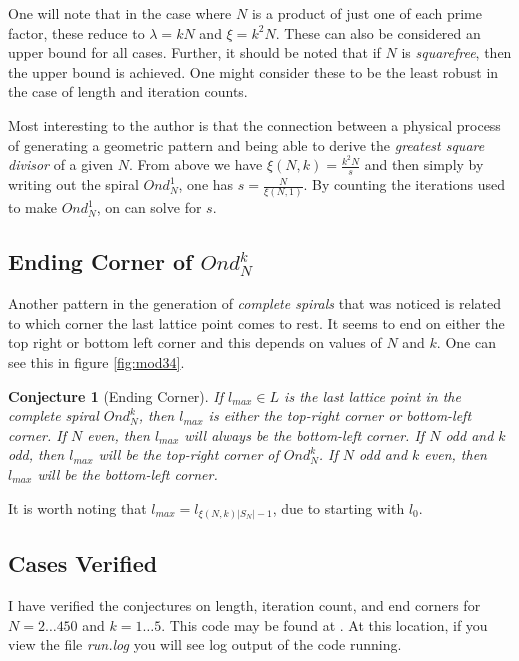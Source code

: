 \documentclass[11pt]{amsart}
\theoremstyle{mydef}
\newtheorem{conj}{Conjecture}[section]
\begin{document}
One will note that in the case where $N$ is a product of just one of each prime factor, these reduce to $\lambda = kN$ and $\xi = k^2N$. These can also be considered an upper bound for all cases. Further, it should be noted that if $N$ is \textit{squarefree}, then the upper bound is achieved. One might consider these to be the least robust in the case of length and iteration counts.

Most interesting to the author is that the connection between a physical process of generating a geometric pattern and being able to derive the \textit{greatest square divisor} of a given $N$. From above we have $\xi(N, k) = \frac{k^2 N}{s}$ and then simply by writing out the spiral $Ond^1_N$, one has $s = \frac{N}{\xi(N,1)}$. By counting the iterations used to make $Ond^1_N$, on can solve for $s$.

\subsection{Ending Corner of $Ond^k_N$}

Another pattern in the generation of \textit{complete spirals} that was noticed is related to which corner the last lattice point comes to rest. It seems to end on either the top right or bottom left corner and this depends on values of $N$ and $k$. One can see this in figure \ref{fig:mod34}. 

\begin{conj}[Ending Corner]
If $l_{max} \in L$ is the last lattice point in the complete spiral $Ond^k_N$, then $l_{max}$ is either the top-right corner or bottom-left corner. If $N$ even, then $l_{max}$ will always be the bottom-left corner. If $N$ odd and $k$ odd, then $l_{max}$ will be the top-right corner of $Ond^k_N$. If $N$ odd and $k$ even, then $l_{max}$ will be the bottom-left corner.
\end{conj}

It is worth noting that $l_{max} = l_{\xi(N, k)\vert S_N \vert - 1}$, due to starting with $l_0$.

\subsection{Cases Verified}
I have verified the conjectures on length, iteration count, and end corners for $N=2\ldots450$ and $k=1\ldots5$. This code may be found at \cite{PySquare}. At this location, if you view the file \textit{run.log} you will see log output of the code running.
\end{document}
